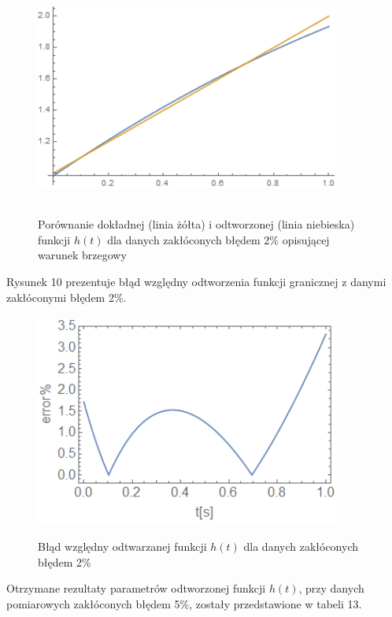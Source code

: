 \documentclass[twoside]{projektInzynierskiMS1}
\begin{document}
\begin{figure}[H]
\begin{center}
		\includegraphics[height=7cm, width=10cm]{pics/2reconstruction.png}\\
	\caption{Porównanie dokładnej (linia żółta) i odtworzonej (linia niebieska) funkcji $h(t)$ dla danych zakłóconych błędem 2\% opisującej warunek brzegowy}
\end{center}
\end{figure}
\newpage
Rysunek 10 prezentuje błąd względny odtworzenia funkcji granicznej z danymi zakłóconymi błędem 2\%. \\

\begin{figure}[H]
\begin{center}
		\includegraphics[height=7cm, width=10cm]{pics/2abs.png}\\
	\caption{Błąd względny odtwarzanej funkcji $h(t)$ dla danych zakłóconych błędem 2\%}
\end{center}
\end{figure}

Otrzymane rezultaty parametrów odtworzonej funkcji $h(t)$, przy danych pomiarowych zakłóconych błędem 5\%, zostały przedstawione w tabeli 13. \\\
\end{document}
